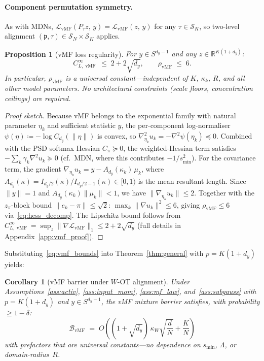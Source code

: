 \documentclass[11pt]{article}
\newtheorem{proposition}[theorem]{Proposition}
\newtheorem{corollary}[theorem]{Corollary}
\newcommand{\R}{\mathbb{R}}
\newcommand{\cL}{\mathcal{L}}
\newcommand{\cS}{\mathcal{S}}
\newcommand{\cB}{\mathcal{B}}
\DeclareMathOperator{\vmf}{vMF}
\newcommand{\nperm}{\mathfrak{p}}  %
\begin{document}
\paragraph{Component permutation symmetry.}
As with MDNs, $\cL_{\vmf}(P_\tau z,\,y) = \cL_{\vmf}(z,\,y)$
for any $\tau \in \cS_K$, so two-level alignment
$(\nperm,\tau) \in \cS_N \times \cS_K$ applies.

\begin{proposition}[vMF loss regularity]\label{prop:vmf_regularity}
For $y \in S^{d_y-1}$ and any $z \in \R^{K(1+d_y)}$:
\begin{equation}\label{eq:vmf_bounds}
  C_{L,\vmf}^\infty \;\le\; 2 + 2\sqrt{d_y},
  \qquad
  \rho_{\vmf} \;\le\; 6.
\end{equation}
In particular, $\rho_{\vmf}$ is a universal constant---independent
of $K$, $\kappa_k$, $R$, and all other model parameters.
No architectural constraints (scale floors, concentration ceilings)
are required.
\end{proposition}

\begin{proof}[Proof sketch]
Because vMF belongs to the exponential family with natural parameter
$\eta_k$ and sufficient statistic $y$, the per-component
log-normaliser $\psi(\eta) \coloneqq -\log C_{d_y}(\|\eta\|)$ is
convex, so
$\nabla^2_{\eta_k} u_k = -\nabla^2\psi(\eta_k) \preceq 0$.
Combined with the PSD softmax Hessian $C_\pi \succeq 0$, the
weighted-Hessian term satisfies
$-\sum_k \gamma_k \nabla^2 u_k \succeq 0$
(cf.\ MDN, where this contributes $-1/s_{\min}^2$).
For the covariance term, the gradient
$\nabla_{\eta_k} u_k = y - A_{d_y}(\kappa_k)\,\mu_k$,
where $A_{d_y}(\kappa) = I_{d_y/2}(\kappa)/I_{d_y/2-1}(\kappa)
\in [0,1)$ is the mean resultant length.
Since $\|y\|=1$ and $A_{d_y}(\kappa_k)\|\mu_k\|<1$, we have
$\|\nabla_{\eta_k} u_k\| \le 2$.
Together with the $z_\pi$-block bound $\|e_k-\pi\|\le\sqrt{2}$:
$\max_k\|\nabla u_k\|^2 \le 6$, giving
$\rho_{\vmf} \le 6$ via~\eqref{eq:hess_decomp}.
The Lipschitz bound follows from
$C_{L,\vmf}^\infty
= \sup_z\|\nabla\cL_{\vmf}\|_1 \le 2 + 2\sqrt{d_y}$
(full details in Appendix~\ref{app:vmf_proof}).
\end{proof}

Substituting~\eqref{eq:vmf_bounds} into
Theorem~\ref{thm:general} with $p=K(1+d_y)$ yields:

\begin{corollary}[vMF barrier under $W$-OT alignment]
\label{cor:vmf_barrier}
Under Assumptions~\ref{ass:activ}, \ref{ass:input_mom},
\ref{ass:mf_law}, and~\ref{ass:subgauss}
with $p = K(1+d_y)$ and $y \in S^{d_y-1}$,
the vMF mixture barrier satisfies, with probability $\ge 1-\delta$:
\begin{equation}\label{eq:vmf_rate}
  \boxed{
  \cB_{\vmf}
  \;=\;
  O\!\left((1+\sqrt{d_y})\,\kappa_W\sqrt{\frac{d}{N}}
  + \frac{K}{N}\right)
  }
\end{equation}
with prefactors that are universal constants---no dependence on
$s_{\min}$, $\Lambda$, or domain-radius~$R$.
\end{corollary}
\end{document}
